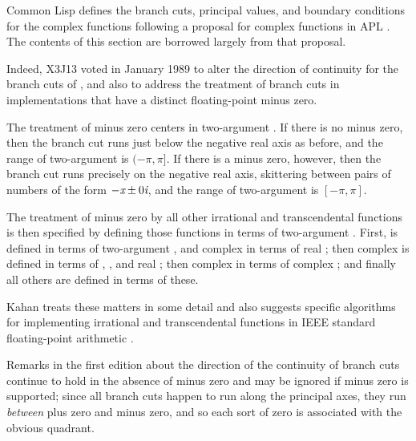 Common Lisp defines the branch cuts, principal values, and boundary
conditions for the complex functions following
a proposal for complex functions in APL \cite{APL-BRANCH-CUTS}.
The contents of this section are borrowed largely from that proposal.

\begin{new}
Indeed, X3J13 voted in January 1989
to alter the direction of continuity for
the branch cuts of , and also
to address the treatment of branch cuts
in implementations that have a distinct floating-point minus zero.

The treatment of minus zero centers in two-argument .
If there is no minus zero, then the branch cut runs just below the negative real
axis as before, and the range of two-argument  is $(-\pi,\pi]$.
If there is a minus zero, however, then the branch cut runs precisely on the negative real
axis, skittering between pairs of numbers of the form $-\emph{x}\pm 0\emph{i}$,
and the range of two-argument  is $[-\pi,\pi]$.

The treatment of minus zero by all other irrational and transcendental functions
is then specified by defining those functions in terms of two-argument .
First,  is defined in terms of two-argument , and
complex  in terms of real ;
then complex  is defined in terms of , , and real ;
then complex  in terms of complex ;
and finally all others are defined in terms of these.

Kahan \cite{KAHAN-COMPLEX-FNS} treats these matters in some detail and also
suggests specific algorithms for implementing irrational and transcendental functions
in IEEE standard floating-point arithmetic \cite{IEEE-PROPOSED-FLOATING-POINT-STANDARD}.

Remarks in the first edition about the direction of the continuity of branch
cuts continue to hold in the absence of minus zero and may be ignored if minus zero
is supported; since all branch cuts happen to run along the principal axes, they
run \emph{between} plus zero and minus zero, and so each sort of zero is associated
with the obvious quadrant.
\end{new}

